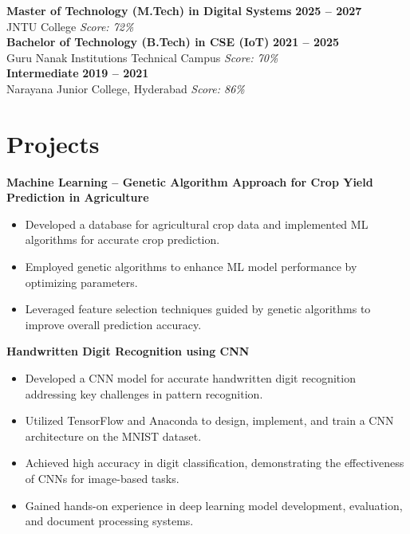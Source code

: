 \documentclass[a4paper,10pt]{article}
\begin{document}
	\textbf{Master of Technology (M.Tech) in Digital Systems} \hfill \textbf{2025 -- 2027} \\
	JNTU College \hfill \textit{Score: 72\%} \\[4pt]
	\textbf{Bachelor of Technology (B.Tech) in CSE (IoT)} \hfill \textbf{2021 -- 2025} \\
	Guru Nanak Institutions Technical Campus \hfill \textit{Score: 70\%} \\[4pt]
	\textbf{Intermediate} \hfill \textbf{2019 -- 2021} \\
	Narayana Junior College, Hyderabad \hfill \textit{Score: 86\%}
	
	\section{Projects}
	
	\noindent\textbf{Machine Learning -- Genetic Algorithm Approach for Crop Yield Prediction in Agriculture}
	\begin{itemize}
		\item Developed a database for agricultural crop data and implemented ML algorithms for accurate crop prediction.
		\item Employed genetic algorithms to enhance ML model performance by optimizing parameters.
		\item Leveraged feature selection techniques guided by genetic algorithms to improve overall prediction accuracy.
	\end{itemize}
	
	\vspace{4pt}
	
	\noindent\textbf{Handwritten Digit Recognition using CNN}
	\begin{itemize}
		\item Developed a CNN model for accurate handwritten digit recognition addressing key challenges in pattern recognition.
		\item Utilized TensorFlow and Anaconda to design, implement, and train a CNN architecture on the MNIST dataset.
		\item Achieved high accuracy in digit classification, demonstrating the effectiveness of CNNs for image-based tasks.
		\item Gained hands-on experience in deep learning model development, evaluation, and document processing systems.
	\end{itemize}
	
\end{document}
